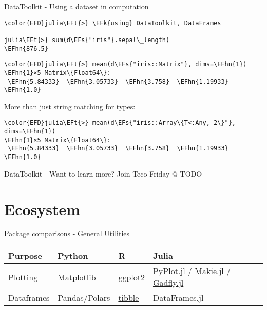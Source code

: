 \documentclass[bigger]{beamer}
\newcommand{\EFs}[1]{\textcolor{EFs}{#1}} %
\newcommand{\EFk}[1]{\textcolor{EFk}{#1}} %
\newcommand{\EFt}[1]{\textcolor{EFt}{#1}} %
\newcommand{\EFhn}[1]{\textcolor{EFhn}{\textbf{#1}}} %
\begin{document}
\begin{frame}[label={sec:org352d563},fragile]{DataToolkit - Using a dataset in computation}
 \begin{Code}
\begin{Verbatim}
\color{EFD}julia\EFt{>} \EFk{using} DataToolkit, DataFrames

julia\EFt{>} sum(d\EFs{"iris"}.sepal\_length)
\EFhn{876.5}
\end{Verbatim}
\end{Code}

\pause

\begin{Code}
\begin{Verbatim}
\color{EFD}julia\EFt{>} mean(d\EFs{"iris::Matrix"}, dims=\EFhn{1})
\EFhn{1}×5 Matrix\{Float64\}:
 \EFhn{5.84333}  \EFhn{3.05733}  \EFhn{3.758}  \EFhn{1.19933}  \EFhn{1.0}
\end{Verbatim}
\end{Code}

\pause

More than just string matching for types:

\begin{Code}
\begin{Verbatim}
\color{EFD}julia\EFt{>} mean(d\EFs{"iris::Array\{T<:Any, 2\}"}, dims=\EFhn{1})
\EFhn{1}×5 Matrix\{Float64\}:
 \EFhn{5.84333}  \EFhn{3.05733}  \EFhn{3.758}  \EFhn{1.19933}  \EFhn{1.0}
\end{Verbatim}
\end{Code}
\end{frame}

\begin{frame}[label={sec:orgabe793f}]{DataToolkit - Want to learn more?}
Join Teco Friday @ TODO
\end{frame}

\section*{Ecosystem}
\label{sec:org7027fbb}
\begin{frame}[label={sec:org3a1f462}]{Package comparisons - General Utilities}
\scriptsize
\begin{center}
\begin{tabular}{l|l|l|l|}
Purpose & Python & R & Julia\\[0pt]
\hline
Plotting & Matplotlib & ggplot2 & \href{https://github.com/JuliaPy/PyPlot.jl}{PyPlot.jl} / \href{https://github.com/MakieOrg/Makie.jl}{Makie.jl} / \href{https://gadflyjl.org/stable/}{Gadfly.jl}\\[0pt]
Dataframes & Pandas/Polars & \href{https://tibble.tidyverse.org/}{tibble} & DataFrames.jl\\[0pt]
\end{tabular}
\end{center}
\end{frame}
\end{document}
